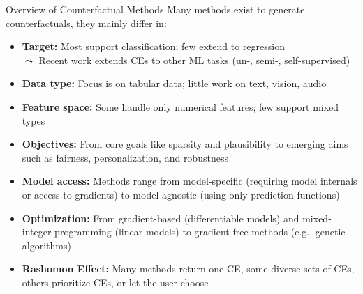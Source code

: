 \documentclass[11pt,compress,t,notes=noshow, aspectratio=169, xcolor=table]{beamer}
\begin{document}
\begin{frame}{Overview of Counterfactual Methods}
Many methods exist to generate counterfactuals, they mainly differ in:
    
	\begin{itemize}[<+->]
		  \item \textbf{Target:} Most support classification; few extend to regression\\
  $\leadsto$ Recent work extends CEs to other ML tasks (un-, semi-, self-supervised)
 \item \textbf{Data type:} Focus is on tabular data; little work on text, vision, audio
		\item \textbf{Feature space:}  Some handle only numerical features; few support mixed types
		\item \textbf{Objectives:} 
        From core goals like sparsity and plausibility to emerging aims such as fairness, personalization, and robustness
		\item \textbf{Model access:} 
        Methods range from model-specific (requiring model internals or access to gradients) to model-agnostic (using only prediction functions)
		 \item \textbf{Optimization:} 
         From gradient-based (differentiable models) and mixed-integer programming (linear models) to gradient-free methods (e.g., genetic algorithms)
		\item \textbf{Rashomon Effect:} Many methods return one CE, some diverse sets of CEs, others prioritize CEs, or let the user choose
	\end{itemize}
\end{frame}
\end{document}
